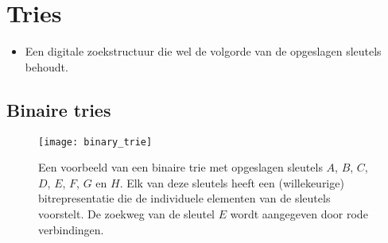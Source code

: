 \section{Tries}
\begin{itemize}
    \item Een digitale zoekstructuur die wel de volgorde van de opgeslagen sleutels behoudt.
\end{itemize}

\subsection{Binaire tries}

\begin{figure}[ht]
    \centering
    \texttt{[image: binary\_trie]}
    \caption{Een voorbeeld van een binaire trie met opgeslagen sleutels $A$, $B$, $C$, $D$, $E$, $F$, $G$ en $H$. Elk van deze sleutels heeft een (willekeurige) bitrepresentatie die de individuele elementen van de sleutels voorstelt. De zoekweg van de sleutel $E$ wordt aangegeven door rode verbindingen.}
    \label{fig:binary_trie}
\end{figure}

